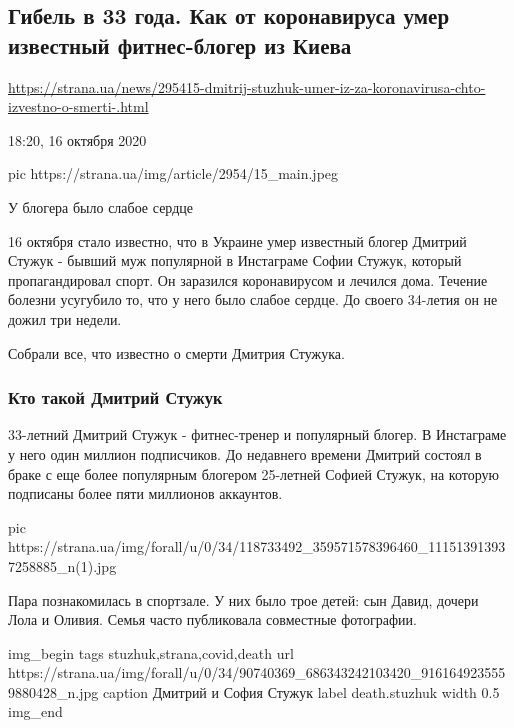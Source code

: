  
 

\subsection{Гибель в 33 года. Как от коронавируса умер известный фитнес-блогер из Киева}
\label{sec:16_10_2020.news.ua.bbc.strana.1_dmitrii_stuzhuk_deat_death}

\url{https://strana.ua/news/295415-dmitrij-stuzhuk-umer-iz-za-koronavirusa-chto-izvestno-o-smerti-.html}

18:20, 16 октября 2020 

\ifcmt
pic https://strana.ua/img/article/2954/15_main.jpeg
\fi

У блогера было слабое сердце

16 октября стало известно, что в Украине умер известный блогер Дмитрий Стужук -
бывший муж популярной в Инстаграме Софии Стужук, который пропагандировал спорт.
Он заразился коронавирусом и лечился дома. Течение болезни усугубило то, что у
него было слабое сердце. До своего 34-летия он не дожил три недели.

Собрали все, что известно о смерти Дмитрия Стужука.

\subsubsection{Кто такой Дмитрий Стужук}

33-летний Дмитрий Стужук - фитнес-тренер и популярный блогер. В Инстаграме у
него один миллион подписчиков. До недавнего времени Дмитрий состоял в браке с
еще более популярным блогером 25-летней Софией Стужук, на которую подписаны
более пяти миллионов аккаунтов.

\ifcmt
pic https://strana.ua/img/forall/u/0/34/118733492_359571578396460_111513913937258885_n(1).jpg
\fi

Пара познакомилась в спортзале. У них было трое детей: сын Давид, дочери Лола и
Оливия. Семья часто публиковала совместные фотографии.

\ifcmt
img_begin 
	tags stuzhuk,strana,covid,death
	url https://strana.ua/img/forall/u/0/34/90740369_686343242103420_9161649235559880428_n.jpg
	caption Дмитрий и София Стужук
	label death.stuzhuk
	width 0.5
img_end
\fi


